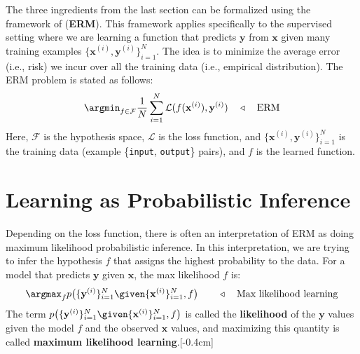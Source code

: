The three ingredients from the last section can be formalized using the framework of  ({\bf ERM}). This framework applies specifically to the supervised setting where we are learning a function that predicts $\mathbf{y}$ from $\mathbf{x}$ given many training examples $\{\mathbf{x}^{(i)},\mathbf{y}^{(i)}\}^N_{i=1}$. The idea is to minimize the average error (i.e., risk) we incur over all the training data (i.e., empirical distribution). The ERM problem is stated as follows:
\begin{align}
    \argmin_{f \in \mathcal{F}} \frac{1}{N} \sum_{i=1}^N \mathcal{L}(f(\mathbf{x}^{(i)}),\mathbf{y}^{(i)}) \quad\triangleleft\quad \text{ERM}
\end{align}
Here, $\mathcal{F}$ is the hypothesis space, $\mathcal{L}$ is the loss function, and $\{\mathbf{x}^{(i)}, \mathbf{y}^{(i)}\}_{i=1}^N$ is the training data (example \{\texttt{input}, \texttt{output}\} pairs), and $f$ is the learned function.

\section{Learning as Probabilistic Inference}
Depending on the loss function, there is often an interpretation of ERM as doing maximum likelihood probabilistic inference. In this interpretation, we are trying to infer the hypothesis $f$ that assigns the highest probability to the data. For a model that predicts $\mathbf{y}$ given $\mathbf{x}$, the max likelihood $f$ is:
\begin{align}
    \argmax_f p\big(\{\mathbf{y}^{(i)}\}_{i=1}^N \given \{\mathbf{x}^{(i)}\}_{i=1}^N, f\big) \quad\quad \triangleleft \quad\text{Max likelihood learning}
\end{align}
The term $p\big(\{\mathbf{y}^{(i)}\}_{i=1}^N \given \{\mathbf{x}^{(i)}\}_{i=1}^N, f\big)$ is called the \textbf{likelihood} of the $\mathbf{y}$ values given the model $f$ and the observed $\mathbf{x}$ values, and maximizing this quantity is called \textbf{maximum likelihood learning}.[-0.4cm]

